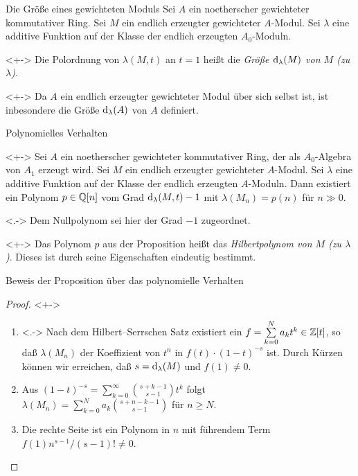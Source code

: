 \begin{frame}{Die Größe eines gewichteten Moduls}
	Sei \(A\) ein noetherscher gewichteter kommutativer Ring.
	Sei \(M\) ein endlich erzeugter gewichteter \(A\)-Modul. Sei
	\(\lambda\) eine additive Funktion auf der Klasse der endlich erzeugten
	\(A_0\)-Moduln.
	\begin{definition}<+->
		Die Polordnung von \(\lambda(M, t)\) an \(t = 1\) heißt die \emph{Größe \(\operatorname{d}_\lambda(M)\)
		von \(M\) (zu \(\lambda\))}.
	\end{definition}
	\begin{example}<+->
		Da \(A\) ein endlich erzeugter gewichteter Modul über sich selbst ist, ist inbesondere
		die Größe \(\operatorname{d}_\lambda(A)\) von \(A\) definiert.
	\end{example}
\end{frame}

\begin{frame}{Polynomielles Verhalten}
	\begin{proposition}<+->
		Sei \(A\) ein noetherscher gewichteter kommutativer Ring, der als \(A_0\)-Algebra von \(A_1\) erzeugt wird.
		Sei \(M\) ein endlich erzeugter gewichteter \(A\)-Modul.
		Sei \(\lambda\) eine additive Funktion auf der Klasse der endlich erzeugten \(A\)-Moduln.
		Dann existiert ein Polynom \(p \in \mathbb Q[n]\) vom Grad \(\operatorname{d}_\lambda(M, t) - 1\) mit \(\lambda(M_n) = p(n)\)
		für \(n \gg 0\).
	\end{proposition}
	\begin{visibleenv}<.->
		Dem Nullpolynom sei hier der Grad \(-1\) zugeordnet.
	\end{visibleenv}
	\begin{visibleenv}<+->
		Das Polynom \(p\) aus der Proposition heißt das
		\emph{Hilbertpolynom von \(M\) (zu \(\lambda\))}. Dieses ist durch
		seine Eigenschaften eindeutig bestimmt.
	\end{visibleenv}
\end{frame}

\begin{frame}{Beweis der Proposition über das polynomielle Verhalten}
	\begin{proof}<+->
		\begin{enumerate}[<+->]
		\item<.->
			Nach dem Hilbert--Serrschen Satz existiert ein
			\(f = \sum\limits_{k = 0}^N a_k t^k \in \mathbb Z[t]\), so daß \(\lambda(M_n)\)
			der Koeffizient von \(t^n\) in \(f(t) \cdot (1 - t)^{-s}\) ist. Durch
			Kürzen können wir erreichen, daß
			\(s = \operatorname{d}_\lambda(M)\) und \(f(1) \neq 0\).
		\item
			Aus \((1 - t)^{-s} = \sum\limits_{k = 0}^\infty \binom{s + k - 1}{s - 1} t^k\) folgt
			\(\lambda(M_n) = \sum\limits_{k = 0}^N a_k \binom{s + n - k - 1}{s - 1}\) für \(n \ge N\).
		\item
			Die rechte Seite ist ein Polynom in \(n\) mit führendem Term
			\(f(1) n^{s - 1}/(s - 1)! \neq 0\).
			\qedhere
		\end{enumerate}
	\end{proof}
\end{frame}

